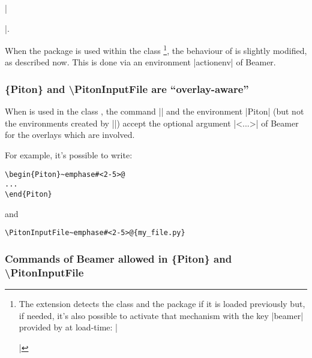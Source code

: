 \documentclass{article}
\begin{document}
|\begin{frame}[fragile=singleslide]|.

\bigskip
When the package  is used within the class
\footnote{The extension  detects the class 
and the package  if it is loaded previously
but, if needed, it's also possible to activate that mechanism with the key
|beamer| provided by  at load-time:
|\usepackage[beamer]{piton}|}, the behaviour of  is slightly 
modified, as described now. This is done via an environment |{actionenv}| of
Beamer.

\subsubsection{\{Piton\} and \textbackslash PitonInputFile are
``overlay-aware''}

When  is used in the class , the command
|\PitonInputFile| and the environment |{Piton}| (but not the environments
created by |\NewPitonEnvironment|) accept the optional argument |<...>| of
Beamer for the overlays which are involved.

For example, it's possible to write:

\begin{Verbatim}
\begin{Piton}~emphase#<2-5>@
...
\end{Piton}
\end{Verbatim}

and 

\begin{Verbatim}
\PitonInputFile~emphase#<2-5>@{my_file.py}
\end{Verbatim}

\subsubsection{Commands of Beamer allowed in \{Piton\} and \textbackslash PitonInputFile}



\end{frame}
\end{document}

